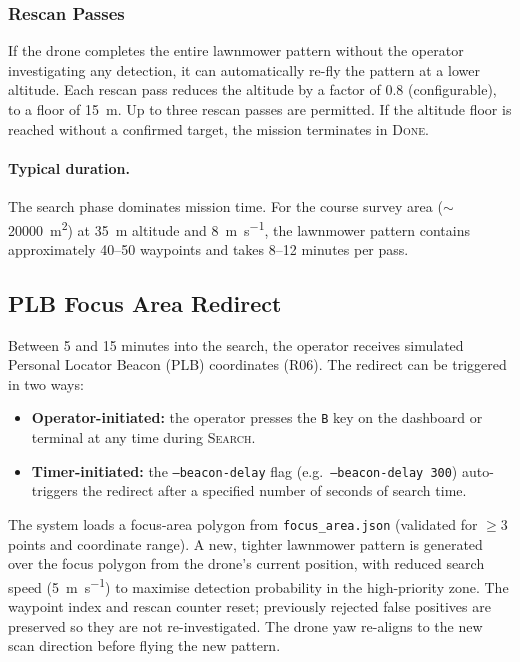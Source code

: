 \subsubsection{Rescan Passes}

If the drone completes the entire lawnmower pattern without the operator investigating any detection, it can automatically re-fly the pattern at a lower altitude.  Each rescan pass reduces the altitude by a factor of 0.8 (configurable), to a floor of \SI{15}{\metre}.  Up to three rescan passes are permitted.  If the altitude floor is reached without a confirmed target, the mission terminates in \textsc{Done}.

\paragraph{Typical duration.}  The search phase dominates mission time.  For the course survey area ($\sim$\SI{20000}{\metre\squared}) at \SI{35}{\metre} altitude and \SI{8}{\metre\per\second}, the lawnmower pattern contains approximately 40--50 waypoints and takes 8--12 minutes per pass.

\subsection{PLB Focus Area Redirect}\label{sec:mf-plb}

Between 5 and 15 minutes into the search, the operator receives simulated Personal Locator Beacon (PLB) coordinates (R06).  The redirect can be triggered in two ways:

\begin{itemize}
  \item \textbf{Operator-initiated:} the operator presses the \texttt{B} key on the dashboard or terminal at any time during \textsc{Search}.
  \item \textbf{Timer-initiated:} the \texttt{--beacon-delay} flag (e.g.\ \texttt{--beacon-delay 300}) auto-triggers the redirect after a specified number of seconds of search time.
\end{itemize}

\noindent The system loads a focus-area polygon from \texttt{focus\_area.json} (validated for $\geq 3$ points and coordinate range).  A new, tighter lawnmower pattern is generated over the focus polygon from the drone's current position, with reduced search speed (\SI{5}{\metre\per\second}) to maximise detection probability in the high-priority zone.  The waypoint index and rescan counter reset; previously rejected false positives are preserved so they are not re-investigated.  The drone yaw re-aligns to the new scan direction before flying the new pattern.


